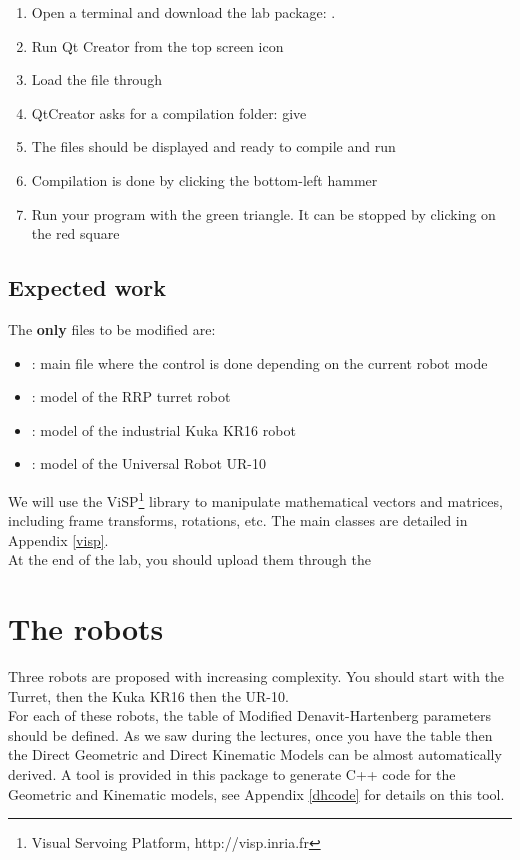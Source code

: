 \documentclass{ecnreport}
\begin{document}
  \begin{enumerate}
    \item Open a terminal and download the lab package: .
    \item Run Qt Creator from the top screen icon
    \item Load the  file through 
    \item QtCreator asks for a compilation folder: give 
    \item The files should be displayed and ready to compile and run
    \item Compilation is done by clicking the bottom-left hammer
    \item Run your program with the green triangle. It can be stopped by clicking on the red square
  \end{enumerate}
  
  \subsection{Expected work}
  
  The {\bf only} files to be modified are:
  \begin{itemize}
    \item {}: main file where the control is done depending on the current robot mode
    \item {}: model of the RRP turret robot
    \item {}: model of the industrial Kuka KR16 robot
    \item {}: model of the Universal Robot UR-10
  \end{itemize}
  We will use the ViSP\footnote{Visual Servoing Platform, http://visp.inria.fr} library to manipulate mathematical vectors and matrices, including frame transforms, rotations, etc. The main classes are detailed in Appendix \ref{visp}.\\
  At the end of the lab, you should upload them through the 
  
  \section{The robots}
  
  \def\wMe{{}^w\M_e}
  
  Three robots are proposed with increasing complexity. You should start with the Turret, then the Kuka KR16 then the UR-10.\\
  For each of these robots, the table of Modified Denavit-Hartenberg parameters should be defined. As we saw during the lectures, once you have the table then the Direct Geometric and Direct Kinematic Models can be almost automatically derived. A tool is provided in this package to generate C++ code for the Geometric and Kinematic models, see Appendix \ref{dhcode} for details on this tool.
  
\end{document}
